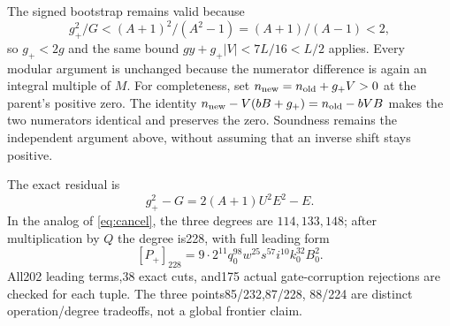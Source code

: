 The signed bootstrap remains valid because
\[
 g_+^2/G<(A+1)^2/(A^2-1)=(A+1)/(A-1)<2,
\]
so $g_+<2g$ and the same bound $gy+g_+|V|<7L/16<L/2$ applies.
Every modular argument is unchanged because the numerator difference is
again an integral multiple of $M$. For completeness, set $n_{\rm new}=n_{\rm old}+g_+V>0$ at the
parent's positive zero. The identity
$n_{\rm new}-V(bB+g_+)=n_{\rm old}-bVB$ makes the two numerators
identical and preserves the zero. Soundness remains the independent
argument above, without assuming that an inverse shift stays positive.

The exact residual is
\[
 g_+^2-G=2(A+1)U^2E^2-E.
\]
In the analog of \eqref{eq:cancel}, the three degrees are $114,133,148$;
after multiplication by $Q$ the degree is228, with full leading form
\[
 [P_+]_{228}=9\cdot2^{11}q_0^{98}w^{25}s^{57}i^{10}k_0^{32}B_0^2.
\]
All202 leading terms,38 exact cuts, and175 actual gate-corruption
rejections are checked for each tuple. The three points85/232,87/228,
88/224 are distinct operation/degree tradeoffs, not a global frontier claim.
